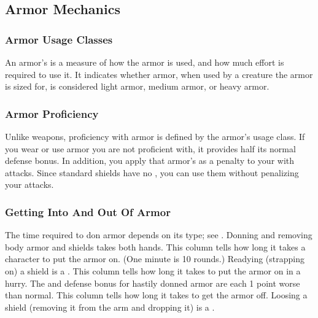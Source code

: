     \subsection{Armor Mechanics}

        \subsubsection{Armor Usage Classes}\label{Armor Usage Classes}
            An armor's  is a measure of how the armor is used, and how much effort is required to use it.
            It indicates whether armor, when used by a creature the armor is sized for, is considered light armor, medium armor, or heavy armor.

        \subsubsection{Armor Proficiency}\label{Armor Proficiency}
            Unlike weapons, proficiency with armor is defined by the armor's usage class.
            If you wear or use armor you are not proficient with, it provides half its normal defense bonus.
            In addition, you apply that armor's  as a penalty to your  with  attacks.
            Since standard shields have no , you can use them without penalizing your attacks.

        \subsubsection{Getting Into And Out Of Armor}
            The time required to don armor depends on its type; see . Donning and removing body armor and shields takes both hands.
             This column tells how long it takes a character to put the armor on. (One minute is 10 rounds.) Readying (strapping on) a shield is a .
             This column tells how long it takes to put the armor on in a hurry. The  and defense bonus for hastily donned armor are each 1 point worse than normal.
             This column tells how long it takes to get the armor off. Loosing a shield (removing it from the arm and dropping it) is a .

